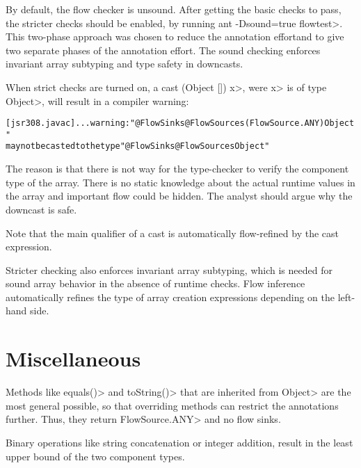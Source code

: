 By default, the flow checker is unsound.  After getting the basic checks to pass, the
 stricter checks should be enabled, by running \<ant -Dsound=true flowtest>.
This two-phase approach was chosen to reduce
the annotation effortand to give two separate phases of
the annotation effort.
 The sound checking enforces invariant 
array subtyping and type safety in downcasts.


When strict checks are turned on,
a cast \<(Object []) x>, were \<x> is of type \<Object>, will result
in a compiler warning:

\begin{alltt}
[jsr308.javac] ... warning: "@FlowSinks @FlowSources({FlowSource.ANY}) Object"
       may not be casted to the type "@FlowSinks @FlowSources Object"
\end{alltt}

The reason is that there is not way for the type-checker to verify
 the component type of the array. There is no static knowledge about the actual
runtime values in the array and important flow could be hidden.
The analyst should argue why the downcast is safe.

Note that the main qualifier of a cast is automatically flow-refined
by the cast expression.


\medskip

Stricter checking also enforces invariant array subtyping, which is
needed for sound array behavior in the absence of runtime checks.
Flow inference automatically refines the type of array creation
expressions depending on the left-hand side.

\section{Miscellaneous}

Methods like \<equals()> and \<toString()> that are inherited from
\<Object> are the most general possible, so that overriding methods
can restrict the annotations further. Thus, they
return \<FlowSource.ANY> and no flow sinks.

Binary operations like string concatenation or integer addition,
result in the least upper bound of the two component types.





